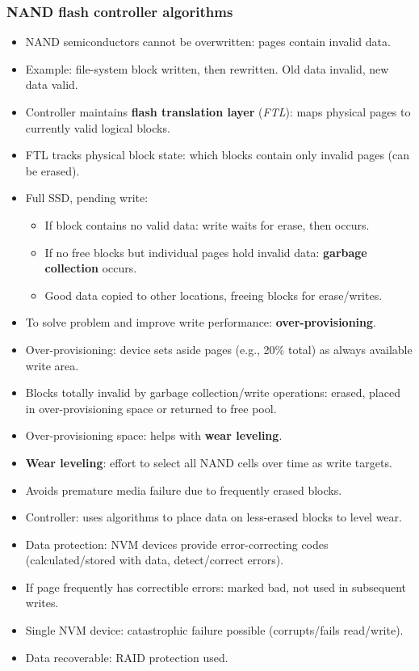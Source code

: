 \subsubsection{NAND flash controller algorithms}
\begin{itemize}
    \item NAND semiconductors cannot be overwritten: pages contain invalid data.
    \item Example: file-system block written, then rewritten. Old data invalid, new data valid.
    \item Controller maintains \textbf{flash translation layer} (\textit{FTL}): maps physical pages to currently valid logical blocks.
    \item FTL tracks physical block state: which blocks contain only invalid pages (can be erased).
    \item Full SSD, pending write:
    \begin{itemize}
        \item If block contains no valid data: write waits for erase, then occurs.
        \item If no free blocks but individual pages hold invalid data: \textbf{garbage collection} occurs.
        \item Good data copied to other locations, freeing blocks for erase/writes.
    \end{itemize}
    \item To solve problem and improve write performance: \textbf{over-provisioning}.
    \item Over-provisioning: device sets aside pages (e.g., 20\% total) as always available write area.
    \item Blocks totally invalid by garbage collection/write operations: erased, placed in over-provisioning space or returned to free pool.
    \item Over-provisioning space: helps with \textbf{wear leveling}.
    \item \textbf{Wear leveling}: effort to select all NAND cells over time as write targets.
    \item Avoids premature media failure due to frequently erased blocks.
    \item Controller: uses algorithms to place data on less-erased blocks to level wear.
    \item Data protection: NVM devices provide error-correcting codes (calculated/stored with data, detect/correct errors).
    \item If page frequently has correctible errors: marked bad, not used in subsequent writes.
    \item Single NVM device: catastrophic failure possible (corrupts/fails read/write).
    \item Data recoverable: RAID protection used.
\end{itemize}


